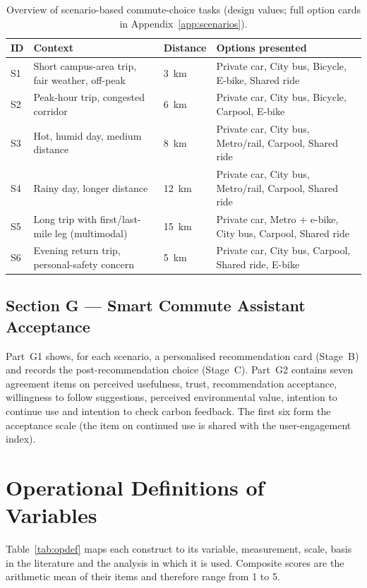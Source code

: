 \documentclass[11pt,a4paper]{article}
\begin{document}
\begin{table}[H]
\centering
\small
\caption{Overview of scenario-based commute-choice tasks (design values; full option cards in
Appendix~\ref{app:scenarios}).}
\label{tab:scenarios}
\begin{tabular}{@{}p{0.8cm}p{6.0cm}p{1.4cm}p{5.6cm}@{}}
\toprule
\textbf{ID} & \textbf{Context} & \textbf{Distance} & \textbf{Options presented}\\
\midrule
S1 & Short campus-area trip, fair weather, off-peak & 3~km & Private car, City bus, Bicycle, E-bike, Shared ride\\
S2 & Peak-hour trip, congested corridor & 6~km & Private car, City bus, Bicycle, Carpool, E-bike\\
S3 & Hot, humid day, medium distance & 8~km & Private car, City bus, Metro/rail, Carpool, Shared ride\\
S4 & Rainy day, longer distance & 12~km & Private car, City bus, Metro/rail, Carpool, Shared ride\\
S5 & Long trip with first/last-mile leg (multimodal) & 15~km & Private car, Metro $+$ e-bike, City bus, Carpool, Shared ride\\
S6 & Evening return trip, personal-safety concern & 5~km & Private car, City bus, Carpool, Shared ride, E-bike\\
\bottomrule
\end{tabular}
\end{table}

\subsection{Section G --- Smart Commute Assistant Acceptance}
Part~G1 shows, for each scenario, a personalised recommendation card (Stage~B) and records the
post-recommendation choice (Stage~C). Part~G2 contains seven agreement items on perceived usefulness,
trust, recommendation acceptance, willingness to follow suggestions, perceived environmental value,
intention to continue use and intention to check carbon feedback. The first six form the acceptance
scale (the item on continued use is shared with the user-engagement index).

\section{Operational Definitions of Variables}
\label{sec:operational}

Table~\ref{tab:opdef} maps each construct to its variable, measurement, scale, basis in the
literature and the analysis in which it is used. Composite scores are the arithmetic mean of their
items and therefore range from 1 to 5.
\end{document}
